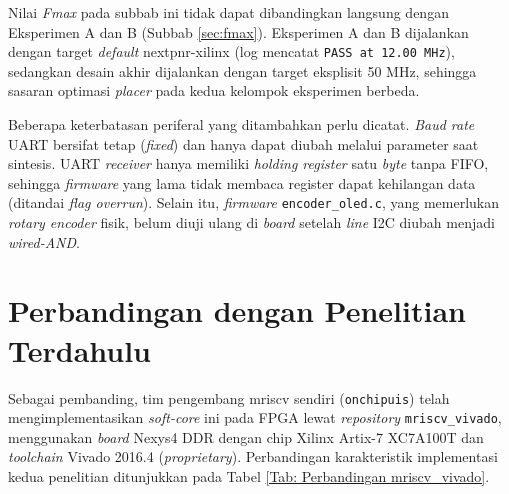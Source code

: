 Nilai \textit{Fmax} pada subbab ini tidak dapat dibandingkan langsung dengan Eksperimen A dan B (Subbab \ref{sec:fmax}). Eksperimen A dan B dijalankan dengan target \textit{default} nextpnr-xilinx (log mencatat \texttt{PASS at 12.00 MHz}), sedangkan desain akhir dijalankan dengan target eksplisit 50 MHz, sehingga sasaran optimasi \textit{placer} pada kedua kelompok eksperimen berbeda.

Beberapa keterbatasan periferal yang ditambahkan perlu dicatat. \textit{Baud rate} UART bersifat tetap (\textit{fixed}) dan hanya dapat diubah melalui parameter saat sintesis. UART \textit{receiver} hanya memiliki \textit{holding register} satu \textit{byte} tanpa FIFO, sehingga \textit{firmware} yang lama tidak membaca register dapat kehilangan data (ditandai \textit{flag overrun}). Selain itu, \textit{firmware} \texttt{encoder\_oled.c}, yang memerlukan \textit{rotary encoder} fisik, belum diuji ulang di \textit{board} setelah \textit{line} I2C diubah menjadi \textit{wired-AND}.

\section{Perbandingan dengan Penelitian Terdahulu}
\label{sec:perbandingan}

Sebagai pembanding, tim pengembang mriscv sendiri (\texttt{onchipuis}) telah mengimplementasikan \textit{soft-core} ini pada FPGA lewat \textit{repository} \texttt{mriscv\_vivado}, menggunakan \textit{board} Nexys4 DDR dengan chip Xilinx Artix-7 XC7A100T dan \textit{toolchain} Vivado 2016.4 (\textit{proprietary}). Perbandingan karakteristik implementasi kedua penelitian ditunjukkan pada Tabel \ref{Tab: Perbandingan mriscv_vivado}.

